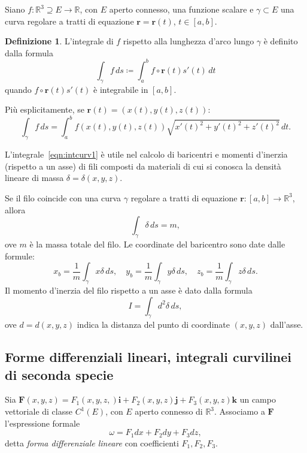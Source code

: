 \documentclass[a4paper]{book}
\numberwithin{equation}{section}
\theoremstyle{plain}
\theoremstyle{definition}
\newtheorem{defn}{Definizione}[section]
\theoremstyle{remark}
\renewcommand{\vec}{\boldsymbol}
\theoremstyle{example}
\begin{document}
Siano $f \colon \mathbb{R}^3 \supseteq E \to \mathbb{R}$, con $E$ aperto connesso, una funzione scalare e $\gamma \subset E$ una curva regolare a tratti di equazione $\vec{r} = \vec{r}(t)$, $t \in [a, b]$.

\begin{defn}
	L'integrale di $f$ rispetto alla lunghezza d'arco lungo $\gamma$ è definito dalla formula
	\begin{equation}
		\label{eqn:intcurv1}
		\int_{\gamma}f\, ds \coloneqq \int_a^b f \circ \vec{r}(t)s'(t)\, dt
	\end{equation}
	quando $f \circ \vec{r}(t)s'(t)$ è integrabile in $[a, b]$.
\end{defn}

Più esplicitamente, se $\vec{r}(t) = (x(t), y(t), z(t))$:
\begin{equation*}
	\int_{\gamma} f \, ds = \int_a^b f(x(t), y(t), z(t)) \sqrt{x'(t)^2 + y'(t)^2 + z'(t)^2} \, dt.
\end{equation*}

L'integrale~\eqref{eqn:intcurv1} è utile nel calcolo di baricentri e momenti d'inerzia (rispetto a un asse) di fili composti da materiali di cui si conosca la densità lineare di massa $\delta = \delta(x, y, z)$.

Se il filo coincide con una curva $\gamma$ regolare a tratti di equazione $\vec{r} \colon\! [a, b] \to \mathbb{R}^3$, allora
\begin{equation*}
	\int_{\gamma} \delta \, ds = m,
\end{equation*}
ove $m$ è la massa totale del filo. Le coordinate del baricentro sono date dalle formule:
\begin{equation}
	x_b = \frac{1}{m} \int_{\gamma}x\delta \, ds, \quad y_b = \frac{1}{m} \int_{\gamma} y\delta \, ds, \quad z_b = \frac{1}{m} \int_{\gamma} z\delta \, ds.
\end{equation}
Il momento d'inerzia del filo rispetto a un asse è dato dalla formula
\begin{equation}
	I = \int_{\gamma} d^2 \delta \, ds,
\end{equation}
ove $d = d(x, y, z)$ indica la distanza del punto di coordinate $(x, y, z)$ dall'asse.

\subsection{Forme differenziali lineari, integrali curvilinei di seconda specie}
Sia $\vec{F}(x, y, z) = F_1(x, y, z,)\vec{i} + F_2(x, y, z)\vec{j} + F_3(x, y, z)\vec{k}$ un campo vettoriale di classe $C^1(E)$, con $E$ aperto connesso di $\mathbb{R}^3$. Associamo a $\vec{F}$ l'espressione formale
\begin{equation}
	\omega = F_1 dx + F_2dy + F_3dz,
\end{equation}
detta \emph{forma differenziale lineare} con coefficienti $F_1, F_2, F_3$.
\end{document}
